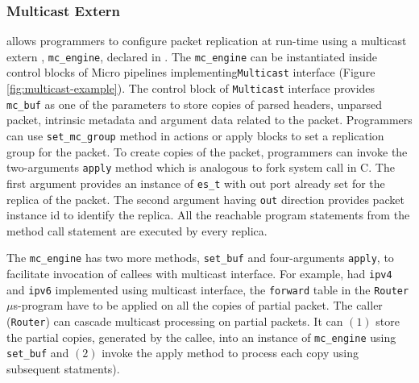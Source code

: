 \documentclass[letterpaper,twocolumn,10pt]{article}
\begin{document}
\subsubsection{Multicast Extern}
\label{sec:multicast}
\ulang allows programmers to configure packet replication at run-time using a multicast extern , \texttt{mc\_engine}, declared in \uarch.
The \texttt{mc\_engine} can be instantiated inside control blocks of Micro pipelines implementing\texttt{Multicast} interface (Figure \ref{fig:multicast-example}).
The control block of \texttt{Multicast} interface provides \texttt{mc\_buf} as one of the parameters to store copies of parsed headers, unparsed packet, intrinsic metadata and argument data related to the packet.
Programmers can use \texttt{set\_mc\_group} method in actions or apply blocks to set a replication group for the packet.
To create copies of the packet, programmers can invoke the two-arguments \texttt{apply} method which is analogous to fork system call in C. 
The first argument provides an instance of \texttt{es\_t} with out port already set for the replica of the packet.
The second argument having \texttt{out} direction provides packet instance id to identify the replica.
All the reachable program statements from the method call statement are executed by every replica.

The \texttt{mc\_engine} has two more methods, \texttt{set\_buf} and four-arguments \texttt{apply}, to facilitate invocation of callees with multicast interface.
For example, had \texttt{ipv4} and \texttt{ipv6} implemented using multicast interface, the \texttt{forward} table in the \texttt{Router} $\mu$s-program have to be applied on all the copies of partial packet.
The caller (\texttt{Router}) can cascade multicast processing on partial packets.
It can $(1)$ store the partial copies, generated by the callee, into an instance of \texttt{mc\_engine} using \texttt{set\_buf} and $(2)$ invoke the apply method to process each copy using subsequent statments). 
\end{document}
